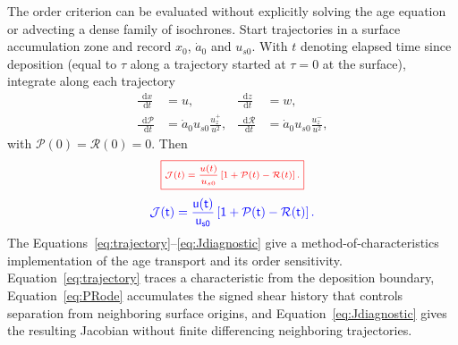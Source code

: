 \documentclass[review]{igs}
\providecommand{\DIFadd}[1]{{\protect\color{blue} \sf #1}} %
\providecommand{\DIFdel}[1]{{\protect\color{red} \scriptsize #1}} %
\providecommand{\DIFaddbegin}{} %
\providecommand{\DIFaddend}{} %
\providecommand{\DIFdelbegin}{} %
\providecommand{\DIFdelend}{} %
\newcommand{\DIFscaledelfig}{0.5}
\newlength{\DIFdelgraphicswidth} %
\newlength{\DIFdelgraphicsheight} %
\newcommand{\DIFaddincludegraphics}[2][]{{\color{blue}\fbox{\DIFOincludegraphics[#1]{#2}}}} %
\newcommand{\DIFdelincludegraphics}[2][]{%
\sbox{\DIFdelgraphicsbox}{\DIFOincludegraphics[#1]{#2}}%
\settoboxwidth{\DIFdelgraphicswidth}{\DIFdelgraphicsbox} %
\settoboxtotalheight{\DIFdelgraphicsheight}{\DIFdelgraphicsbox} %
\scalebox{\DIFscaledelfig}{%
\parbox[b]{\DIFdelgraphicswidth}{\usebox{\DIFdelgraphicsbox}\\[-\baselineskip] \rule{\DIFdelgraphicswidth}{0em}}\llap{\resizebox{\DIFdelgraphicswidth}{\DIFdelgraphicsheight}{%
\setlength{\unitlength}{\DIFdelgraphicswidth}%
\begin{picture}(1,1)%
\thicklines\linethickness{2pt} %
{\color[rgb]{1,0,0}\put(0,0){\framebox(1,1){}}}%
{\color[rgb]{1,0,0}\put(0,0){\line( 1,1){1}}}%
{\color[rgb]{1,0,0}\put(0,1){\line(1,-1){1}}}%
\end{picture}%
}\hspace*{3pt}}} %
} %
\DeclareRobustCommand{\DIFaddbegin}{\DIFOaddbegin \let\includegraphics\DIFaddincludegraphics} %
\DeclareRobustCommand{\DIFaddend}{\DIFOaddend \let\includegraphics\DIFOincludegraphics} %
\DeclareRobustCommand{\DIFdelbegin}{\DIFOdelbegin \let\includegraphics\DIFdelincludegraphics} %
\DeclareRobustCommand{\DIFdelend}{\DIFOaddend \let\includegraphics\DIFOincludegraphics} %
\begin{document}
The order criterion can be evaluated without explicitly solving the age equation or advecting a dense family of isochrones. Start trajectories in a surface accumulation zone and record \(x_0\), \(\dot a_0\) and \(u_{s0}\). With \(t\) denoting \DIFaddbegin \DIFadd{elapsed }\DIFaddend time since deposition \DIFaddbegin \DIFadd{(equal to \(\tau\) along a trajectory started at \(\tau=0\) at the surface)}\DIFaddend , integrate along each trajectory
\begin{align}
\frac{\mathop{}\!\mathrm{d} x}{\mathop{}\!\mathrm{d} t}&=u,
&
\frac{\mathop{}\!\mathrm{d} z}{\mathop{}\!\mathrm{d} t}&=w,
\label{eq:trajectory}\\
\frac{\mathop{}\!\mathrm{d}\mathcal{P}}{\mathop{}\!\mathrm{d} t}
&=\dot a_0u_{s0}\frac{u_z^+}{u^2},
&
\frac{\mathop{}\!\mathrm{d}\mathcal{R}}{\mathop{}\!\mathrm{d} t}
&=\dot a_0u_{s0}\frac{u_z^-}{u^2},
\label{eq:PRode}
\end{align}
with \(\mathcal{P}(0)=\mathcal{R}(0)=0\). Then
\DIFdelbegin \begin{displaymath}
\DIFdel{\boxed{
\mathcal{J}(t)=\frac{u(t)}{u_{s0}}
\left[1+\mathcal{P}(t)-\mathcal{R}(t)\right].
}
}\end{displaymath}%
\DIFdelend \DIFaddbegin \begin{equation}
\DIFadd{\mathcal{J}(t)=\frac{u(t)}{u_{s0}}
\left[1+\mathcal{P}(t)-\mathcal{R}(t)\right].
\label{eq:Jdiagnostic}
}\end{equation}\DIFaddend 
\DIFdelbegin \DIFdel{The }\DIFdelend \DIFaddbegin \DIFadd{Equations~\ref{eq:trajectory}--\ref{eq:Jdiagnostic} give a method-of-characteristics implementation of the age transport and its order sensitivity. Equation~\ref{eq:trajectory} traces a characteristic from the deposition boundary, Equation~\ref{eq:PRode} accumulates the signed shear history that controls separation from neighboring surface origins, and Equation~\ref{eq:Jdiagnostic} gives the resulting Jacobian without finite differencing neighboring trajectories.
}
\end{document}

